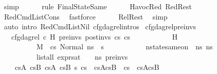 \begin{isabellebody}
\ simp\isanewline
\ \ \ \ \isamarkupfalse%
\ {\isacharparenleft}{\kern0pt}rule\ FinalStateSame{\isacharparenright}{\kern0pt}\isanewline
\ \ \ \ \isamarkupfalse%
\ HavocRed\ RedRest\ \isanewline
\ \ \ \ \isamarkupfalse%
\ RedCmdListCons\ \isamarkupfalse%
\ fastforce\isanewline
\ \ \ \ \isamarkupfalse%
\ RelRest\ \isamarkupfalse%
\ simp\isanewline
{}\isamarkupfalse%
\ {\isacharparenleft}{\kern0pt}auto\ intro{\isacharcolon}{\kern0pt}\ RedCmdListNil\ cfg{\isacharunderscore}{\kern0pt}dag{\isacharunderscore}{\kern0pt}rel{\isachardot}{\kern0pt}intros{\isacharparenright}{\kern0pt}%
\endisatagproof
{\isafoldproof}%
%
\isadelimproof
\isanewline
%
\endisadelimproof
\isanewline
{}\isamarkupfalse%
\ cfg{\isacharunderscore}{\kern0pt}dag{\isacharunderscore}{\kern0pt}rel{\isacharunderscore}{\kern0pt}pre{\isacharunderscore}{\kern0pt}invs{\isacharcolon}{\kern0pt}\isanewline
\ \ \ {\isachardoublequoteopen}cfg{\isacharunderscore}{\kern0pt}dag{\isacharunderscore}{\kern0pt}rel\ c\ H\ pre{\isacharunderscore}{\kern0pt}invs\ post{\isacharunderscore}{\kern0pt}invs\ cs{}\ cs{}{\isachardoublequoteclose}\ \isanewline
\ \ \ \ \ \ \ \ \ \ {\isachardoublequoteopen}H\ {\isacharequal}{\kern0pt}\ {\isacharbrackleft}{\kern0pt}{\isacharbrackright}{\kern0pt}{\isachardoublequoteclose}\ \isanewline
\ \ \ \ \ \ \ \ \ \ {\isachardoublequoteopen}M{\isacharcomma}{\kern0pt}{\isasymLambda}{\isacharcomma}{\kern0pt}{\isasymGamma}{\isacharcomma}{\kern0pt}{\isasymOmega}\ {\isasymturnstile}\ {\isasymlangle}cs{}{\isacharcomma}{\kern0pt}\ Normal\ ns{}{\isasymrangle}\ {\isacharbrackleft}{\kern0pt}{\isasymrightarrow}{\isacharbrackright}{\kern0pt}\ s{\isacharprime}{\kern0pt}{\isachardoublequoteclose}\ \isanewline
\ \ \ \ \ \ \ \ \ \ {\isachardoublequoteopen}nstate{\isacharunderscore}{\kern0pt}same{\isacharunderscore}{\kern0pt}on\ {\isasymLambda}\ ns{}\ ns{}\ {\isacharbraceleft}{\kern0pt}{\isacharbraceright}{\kern0pt}{\isachardoublequoteclose}\ \isanewline
\ \ \ \ \ \ \ \ \ \ {\isachardoublequoteopen}list{\isacharunderscore}{\kern0pt}all\ {\isacharparenleft}{\kern0pt}expr{\isacharunderscore}{\kern0pt}sat\ {\isasymLambda}\ {\isasymGamma}\ {\isasymOmega}\ ns{}{\isacharparenright}{\kern0pt}\ pre{\isacharunderscore}{\kern0pt}invs{\isachardoublequoteclose}\isanewline
\ \ \ {\isachardoublequoteopen}{\isacharparenleft}{\kern0pt}{\isasymexists}\ cs{}A\ cs{}B\ cs{}A\ cs{}B\ s{\isacharprime}{\kern0pt}{\isacharprime}{\kern0pt}{\isachardot}{\kern0pt}\ cs{}\ {\isacharequal}{\kern0pt}\ cs{}A{\isacharat}{\kern0pt}cs{}B\ {\isasymand}\ cs{}\ {\isacharequal}{\kern0pt}\ cs{}A{\isacharat}{\kern0pt}cs{}B\ {\isasymand}\ \ \isanewline

\end{isabellebody}
